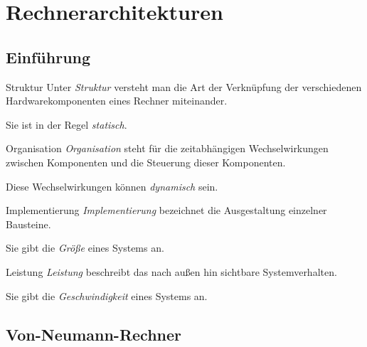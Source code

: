 \section{Rechnerarchitekturen}\label{sec:rechnerarchitekturen}

\subsection{Einführung}\label{subsec:einfuehrung}

\begin{defi}{Struktur}
    Unter \emph{Struktur} versteht man die Art der Verknüpfung der verschiedenen Hardwarekomponenten eines Rechner miteinander.

    Sie ist in der Regel \emph{statisch}.
\end{defi}

\begin{defi}{Organisation}
    \emph{Organisation} steht für die zeitabhängigen Wechselwirkungen zwischen Komponenten und die Steuerung dieser Komponenten.

    Diese Wechselwirkungen können \emph{dynamisch} sein.
\end{defi}

\begin{defi}{Implementierung}
    \emph{Implementierung} bezeichnet die Ausgestaltung einzelner Bausteine.

    Sie gibt die \emph{Größe} eines Systems an.
\end{defi}

\begin{defi}{Leistung}
    \emph{Leistung} beschreibt das nach außen hin sichtbare Systemverhalten.

    Sie gibt die \emph{Geschwindigkeit} eines Systems an.
\end{defi}

\subsection{Von-Neumann-Rechner}\label{subsec:von-neumann-rechner}

